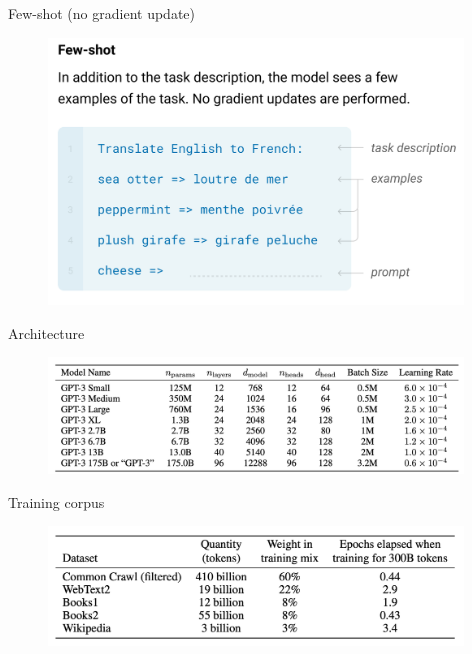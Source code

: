 \begin{vbframe}{Few-shot (no gradient update)}

\vfill

	\begin{figure}
		\centering
		\includegraphics[width=11cm]{figure/gptfewshot.png}
	\end{figure}

\vfill

\end{vbframe}



\begin{vbframe}{Architecture}

\vfill

	\begin{figure}
		\centering
		\includegraphics[width=11cm]{figure/gptarch.png}
	\end{figure}

\vfill

\end{vbframe}



\begin{vbframe}{Training corpus}

\vfill

	\begin{figure}
		\centering
		\includegraphics[width=11cm]{figure/traincorp.png}
	\end{figure}
\vfill

\end{vbframe}



